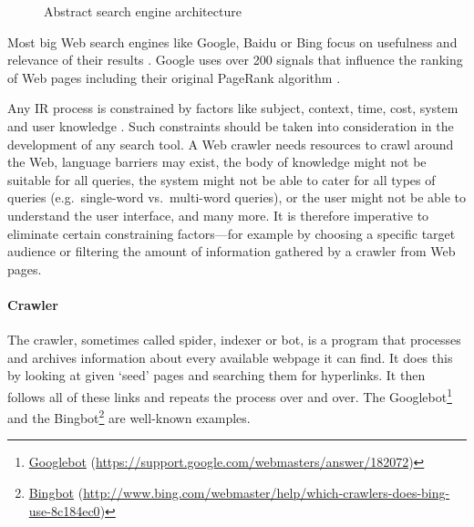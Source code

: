 \begin{figure}[!htbp]
  \centering
\caption[Search engine architecture]{Abstract search engine architecture}
\label{fig:sea}
\end{figure}

Most big Web search engines like Google, Baidu or Bing focus on usefulness and relevance of their results \autocite{Google2012, Baidu2012, Microsoft2012a}. Google uses over \num{200} signals \citeyear{Google2012} that influence the ranking of Web pages including their original PageRank algorithm \autocite{Brin1998, Brin1998b}.

Any \ac{IR} process is constrained by factors like subject, context, time, cost, system and user knowledge \autocite{Marchionini1988}. Such constraints should be taken into consideration in the development of any search tool. A Web crawler needs resources to crawl around the Web, language barriers may exist, the body of knowledge might not be suitable for all queries, the system might not be able to cater for all types of queries (e.g.\ single-word vs.\ multi-word queries), or the user might not be able to understand the user interface, and many more. It is therefore imperative to eliminate certain constraining factors---for example by choosing a specific target audience or filtering the amount of information gathered by a crawler from Web pages.

\paragraph{Crawler}
The crawler, sometimes called spider, indexer or bot, is a program that processes and archives information about every available webpage it can find. It does this by looking at given `seed' pages and searching them for hyperlinks. It then follows all of these links and repeats the process over and over. The Googlebot\footnote{\href{https://support.google.com/webmasters/answer/182072}{Googlebot} (\url{https://support.google.com/webmasters/answer/182072})} and the Bingbot\footnote{\href{http://www.bing.com/webmaster/help/which-crawlers-does-bing-use-8c184ec0}{Bingbot} (\url{http://www.bing.com/webmaster/help/which-crawlers-does-bing-use-8c184ec0})} are well-known examples.


